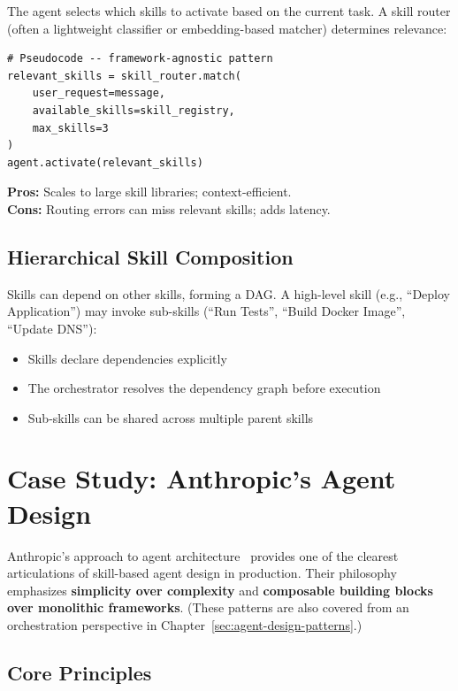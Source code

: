 The agent selects which skills to activate based on the current task. A skill router (often a lightweight classifier or embedding-based matcher) determines relevance:

\begin{lstlisting}[style=pythonstyle]
# Pseudocode -- framework-agnostic pattern
relevant_skills = skill_router.match(
    user_request=message,
    available_skills=skill_registry,
    max_skills=3
)
agent.activate(relevant_skills)
\end{lstlisting}

\textbf{Pros:} Scales to large skill libraries; context-efficient.\\

\textbf{Cons:} Routing errors can miss relevant skills; adds latency.

\subsection{Hierarchical Skill Composition}
\label{hierarchical-skill-composition}

Skills can depend on other skills, forming a DAG. A high-level skill (e.g., ``Deploy Application'') may invoke sub-skills (``Run Tests'', ``Build Docker Image'', ``Update DNS''):

\begin{itemize}
  \item Skills declare dependencies explicitly
  \item The orchestrator resolves the dependency graph before execution
  \item Sub-skills can be shared across multiple parent skills
\end{itemize}

\section{Case Study: Anthropic’s Agent Design}
\label{case-study-anthropics-agent-design}

Anthropic’s approach to agent architecture~\cite{anthropic2024buildingagents} provides one of the clearest articulations of skill-based agent design in production. Their philosophy emphasizes \textbf{simplicity over complexity} and \textbf{composable building blocks over monolithic frameworks}. (These patterns are also covered from an orchestration perspective in Chapter~\ref{sec:agent-design-patterns}.)

\subsection{Core Principles}
\label{core-principles}

